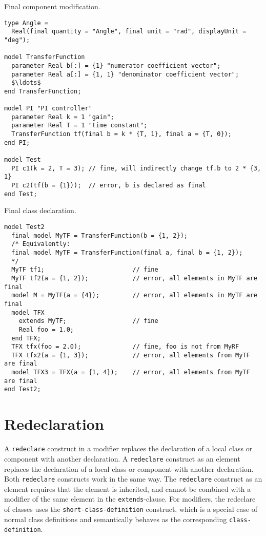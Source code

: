 \begin{example}
Final component modification.
\begin{lstlisting}[language=modelica]
type Angle =
  Real(final quantity = "Angle", final unit = "rad", displayUnit = "deg");

model TransferFunction
  parameter Real b[:] = {1} "numerator coefficient vector";
  parameter Real a[:] = {1, 1} "denominator coefficient vector";
  $\ldots$
end TransferFunction;

model PI "PI controller"
  parameter Real k = 1 "gain";
  parameter Real T = 1 "time constant";
  TransferFunction tf(final b = k * {T, 1}, final a = {T, 0});
end PI;

model Test
  PI c1(k = 2, T = 3); // fine, will indirectly change tf.b to 2 * {3, 1}
  PI c2(tf(b = {1}));  // error, b is declared as final
end Test;
\end{lstlisting}
\end{example}

\begin{example}
Final class declaration.
\begin{lstlisting}[language=modelica]
model Test2
  final model MyTF = TransferFunction(b = {1, 2});
  /* Equivalently:
  final model MyTF = TransferFunction(final a, final b = {1, 2});
  */
  MyTF tf1;                        // fine
  MyTF tf2(a = {1, 2});            // error, all elements in MyTF are final
  model M = MyTF(a = {4});         // error, all elements in MyTF are final
  model TFX
    extends MyTF;                  // fine
    Real foo = 1.0;
  end TFX;
  TFX tfx(foo = 2.0);              // fine, foo is not from MyRF
  TFX tfx2(a = {1, 3});            // error, all elements from MyTF are final
  model TFX3 = TFX(a = {1, 4});    // error, all elements from MyTF are final
end Test2;
\end{lstlisting}
\end{example}

\section{Redeclaration}\label{redeclaration}

A \lstinline!redeclare! construct in a modifier replaces the declaration of a local class or component with another declaration.
A \lstinline!redeclare! construct as an element replaces the declaration of a local class or component with another declaration.
Both \lstinline!redeclare! constructs work in the same way.
The \lstinline!redeclare! construct as an element requires that the element is inherited, and cannot be combined with a modifier of the same element in the \lstinline!extends!-clause.
For modifiers, the redeclare of classes uses the \lstinline[language=grammar]!short-class-definition! construct, which is a special case of normal class definitions and semantically behaves as the corresponding \lstinline[language=grammar]!class-definition!.


